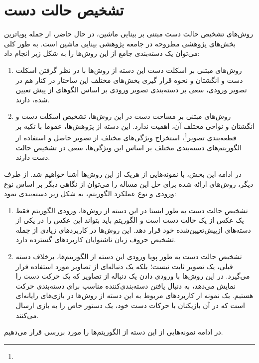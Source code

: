 \documentclass[11.5pt,a4paper]{article}
\newcommand{\enfootnote}[1]{\footnote{\lr{#1}}}
\begin{document}
\section{ تشخیص حالت دست}

روش‌های تشخیص حالت دست مبتنی بر بینایی ماشین، در حال حاضر، از جمله پویاترین بخش‌های پژوهشی مطروحه در جامعه پژوهشی بینایی ماشین است. به طور کلی می‌توان یک دسته‌بندی جامع از این روش‌ها را به شکل زیر انجام داد:

\begin{enumerate}
\item روش‌های مبتنی بر اسکلت دست
این دسته از روش‌ها با در نظر گرفتن اسکلت دست و انگشتان و نحوه قرار گیری بخش‌های مختلف این ساختار در کنار هم در تصویر ورودی، سعی بر دسته‌بندی تصویر ورودی بر اساس الگوهای از پیش تعیین شده، دارند.
\item روش‌های مبتنی بر مساحت دست
در این روش‌ها، تشخیص اسکلت دست و انگشتان و نواحی مختلف آن، اهمیت ندارد. این دسته از پژوهش‌ها، عموما با تکیه بر قطعه‌بندی تصویر\enfootnote{Image Segmentation}، استخراج ویژگی‌های مختلف از تصویر حاصل و استفاده از الگوریتم‌های دسته‌بندی مختلف بر اساس این ویژگی‌ها، سعی در تشخیص حالت دست دارند.
\end{enumerate}

در ادامه این بخش، با نمونه‌هایی از هریک از این روش‌ها آشنا خواهیم شد. از طرف دیگر، روش‌های ارائه شده برای حل این مساله را می‌توان از نگاهی دیگر بر اساس نوع ورودی و نوع عملکرد الگوریتم، به شکل زیر دسته‌بندی نمود:

\begin{enumerate}
\item تشخیص حالت دست به طور ایستا
در این دسته از روش‌ها، ورودی الگوریتم فقط یک عکس از یک حالت دست است و الگوریتم باید بتواند این عکس را در یکی از دسته‌های ازپیش‌تعیین‌شده خود قرار دهد. این روش‌ها در کاربردهای زیادی از جمله تشخیص حروف زبان ناشنوایان کاربردهای گسترده دارد.

\item تشخیص حالت دست به طور پویا
ورودی این دسته از الگوریتم‌ها، برخلاف دسته قبلی، یک تصویر ثابت نیست؛ بلکه یک دنباله‌ای از تصاویر مورد استفاده قرار می‌گیرد. در این روش‌ها با ورودی دادن یک دنباله از تصاویر که یک حرکت دست را نمایش می‌دهد، به دنبال یافتن دسته‌بندی‌کننده مناسب برای دسته‌بندی حرکت هستیم. یک نمونه از کاربردهای مربوط به این دسته از روش‌ها در بازی‌های رایانه‌ای است که در آن بازیکنان با حرکات دست خود، یک دستور خاص را به بازی ارسال می‌کنند. 
\end{enumerate}

در ادامه نمونه‌هایی از این دسته از الگوریتم‌ها را مورد بررسی قرار می‌دهیم.
\end{document}
